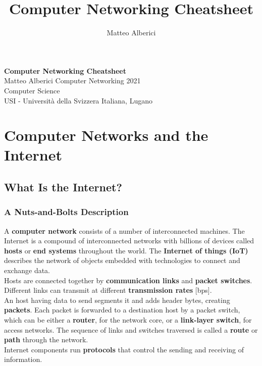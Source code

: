 \documentclass{article}
\title{Computer Networking Cheatsheet}
\author{Matteo Alberici}
\begin{document}
\begin{titlepage}
    \begin{center}
        \vspace*{1cm}
        \Huge
        \textbf{Computer Networking Cheatsheet}
        \vspace{0.5cm}
        \LARGE
        \vspace{.5cm} \\
        Matteo Alberici
   		\vspace{1.5cm}
        \vfill
        \vspace{.8cm}
        \Large
          Computer Networking 2021\\
        Computer Science\\
        USI - Universit\`{a} della Svizzera Italiana, Lugano\\
    \end{center}
\end{titlepage}

\tableofcontents

\newpage

\section{Computer Networks and the Internet}

\subsection{What Is the Internet?}
\subsubsection{A Nuts-and-Bolts Description}
A \textbf{computer network} consists of a number of interconnected machines. The Internet is a compound of interconnected networks with billions of devices called \textbf{hosts} or \textbf{end systems} throughout the world. The \textbf{Internet of things (IoT)} describes the network of objects embedded with technologies to connect and exchange data. \\
Hosts are connected together by \textbf{communication links} and \textbf{packet switches}. Different links can transmit at different \textbf{transmission rates} [bps]. \\
An host having data to send segments it and adds header bytes, creating \textbf{packets}. Each packet is forwarded to a destination host by a packet switch, which can be either a \textbf{router}, for the network core, or a \textbf{link-layer switch}, for access networks. The sequence of links and switches traversed is called a \textbf{route} or \textbf{path} through the network. \\
Internet components run \textbf{protocols} that control the sending and receiving of information.
\end{document}
